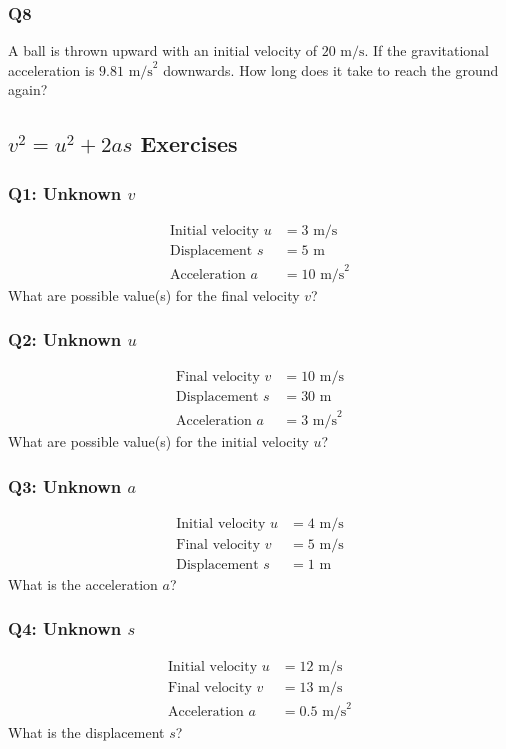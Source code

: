 \documentclass{article}
\begin{document}
\subsubsection{Q8}
A ball is thrown upward with an initial velocity of $20\text{ m/s}$. If the gravitational acceleration is $9.81\text{ m/s}^2$ downwards. How long does it take to reach the ground again? 
\subsection{$v^2 = u^2 + 2as$ Exercises}
\subsubsection{Q1: Unknown $v$}
\begin{align}
\text{Initial velocity } u&=3 \text{ m/s}\\
\text{Displacement }s&=5 \text{ m}\\
\text{Acceleration }a&=10 \text{ m/s}^2
\end{align}
What are possible value(s) for the final velocity $v$? 
\subsubsection{Q2: Unknown $u$}
\begin{align}
\text{Final velocity } v&=10 \text{ m/s}\\
\text{Displacement }s&=30 \text{ m}\\
\text{Acceleration }a&=3 \text{ m/s}^2
\end{align}
What are possible value(s) for the initial velocity $u$? 
\subsubsection{Q3: Unknown $a$}
\begin{align}
\text{Initial velocity } u&=4 \text{ m/s}\\
\text{Final velocity }v&=5 \text{ m/s}\\
\text{Displacement }s&=1 \text{ m}
\end{align}
What is the acceleration $a$?
\subsubsection{Q4: Unknown $s$}
\begin{align}
\text{Initial velocity } u&=12 \text{ m/s}\\
\text{Final velocity }v&=13 \text{ m/s}\\
\text{Acceleration }a&=0.5 \text{ m/s}^2
\end{align}
What is the displacement $s$?
\end{document}
